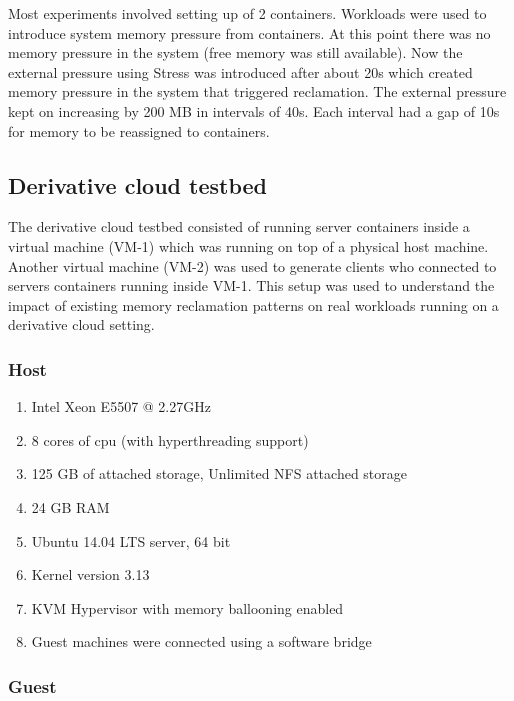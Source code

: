 	Most experiments involved setting up of 2 containers. Workloads were used to introduce system memory pressure from containers. At 
this point there was no memory pressure in the system (free memory was still available). Now the external pressure using Stress was 
introduced after about 20s which created memory pressure in the system that triggered reclamation. The external pressure kept on increasing 
by 200 MB in intervals of 40s. Each interval had a gap of 10s for memory to be reassigned to containers.

    \subsection{Derivative cloud testbed}
      \label{section_testbed_derivative}
      
       The derivative cloud testbed consisted of running server containers inside a virtual machine (VM-1) which was running on top of a 
physical host machine. Another virtual machine (VM-2) was used to generate clients who connected to servers containers running inside VM-1. 
This setup was used to understand the impact of existing memory reclamation patterns on real workloads running on a derivative cloud 
setting.
	
      \subsubsection{Host}
	
	\begin{enumerate}
	  \item Intel Xeon E5507 @ 2.27GHz
	  \item 8 cores of cpu (with hyperthreading support)
	  \item 125 GB of attached storage, Unlimited NFS attached storage 
	  \item 24 GB RAM
	  \item Ubuntu 14.04 LTS server, 64 bit 
	  \item Kernel version 3.13
	  \item KVM Hypervisor with memory ballooning enabled
	  \item Guest machines were connected using a software bridge
	\end{enumerate}
      
      \subsubsection{Guest}
	
